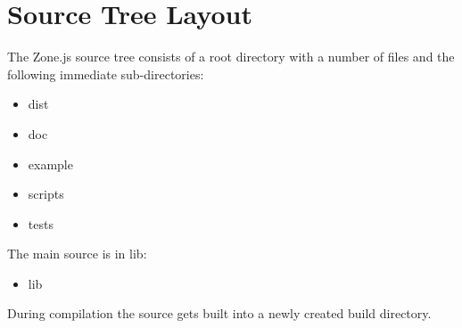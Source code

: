 \section{Source Tree Layout}

The Zone.js source tree consists of a root directory with a number of files and the
following immediate sub-directories:

\begin{itemize}
  \item dist
  \item doc
  \item example
  \item scripts
  \item tests
\end{itemize}

The main source is in lib:

\begin{itemize}
  \item lib
\end{itemize}

During compilation the source gets built into a newly created build directory.










